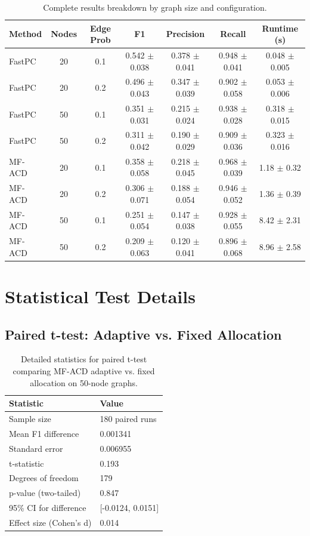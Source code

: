 \documentclass{article}
\begin{document}
\begin{table}[h]
\caption{Complete results breakdown by graph size and configuration.}
\label{tab:complete}
\centering
\small
\begin{tabular}{lcccccc}
\toprule
Method & Nodes & Edge Prob & F1 & Precision & Recall & Runtime (s) \\
\midrule
FastPC & 20 & 0.1 & 0.542 $\pm$ 0.038 & 0.378 $\pm$ 0.041 & 0.948 $\pm$ 0.041 & 0.048 $\pm$ 0.005 \\
FastPC & 20 & 0.2 & 0.496 $\pm$ 0.043 & 0.347 $\pm$ 0.039 & 0.902 $\pm$ 0.058 & 0.053 $\pm$ 0.006 \\
FastPC & 50 & 0.1 & 0.351 $\pm$ 0.031 & 0.215 $\pm$ 0.024 & 0.938 $\pm$ 0.028 & 0.318 $\pm$ 0.015 \\
FastPC & 50 & 0.2 & 0.311 $\pm$ 0.042 & 0.190 $\pm$ 0.029 & 0.909 $\pm$ 0.036 & 0.323 $\pm$ 0.016 \\
\midrule
MF-ACD & 20 & 0.1 & 0.358 $\pm$ 0.058 & 0.218 $\pm$ 0.045 & 0.968 $\pm$ 0.039 & 1.18 $\pm$ 0.32 \\
MF-ACD & 20 & 0.2 & 0.306 $\pm$ 0.071 & 0.188 $\pm$ 0.054 & 0.946 $\pm$ 0.052 & 1.36 $\pm$ 0.39 \\
MF-ACD & 50 & 0.1 & 0.251 $\pm$ 0.054 & 0.147 $\pm$ 0.038 & 0.928 $\pm$ 0.055 & 8.42 $\pm$ 2.31 \\
MF-ACD & 50 & 0.2 & 0.209 $\pm$ 0.063 & 0.120 $\pm$ 0.041 & 0.896 $\pm$ 0.068 & 8.96 $\pm$ 2.58 \\
\bottomrule
\end{tabular}
\end{table}

\section{Statistical Test Details}

\subsection{Paired t-test: Adaptive vs. Fixed Allocation}

\begin{table}[h]
\caption{Detailed statistics for paired t-test comparing MF-ACD adaptive vs. fixed allocation on 50-node graphs.}
\label{tab:ttest}
\centering
\begin{tabular}{ll}
\toprule
Statistic & Value \\
\midrule
Sample size & 180 paired runs \\
Mean F1 difference & 0.001341 \\
Standard error & 0.006955 \\
t-statistic & 0.193 \\
Degrees of freedom & 179 \\
p-value (two-tailed) & 0.847 \\
95\% CI for difference & [-0.0124, 0.0151] \\
Effect size (Cohen's d) & 0.014 \\
\bottomrule
\end{tabular}
\end{table}
\end{document}
